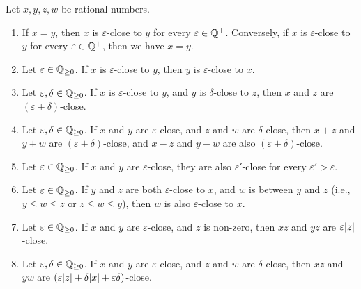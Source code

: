 \setcounter{thm}{6}
\begin{prop}\label{i:4.3.7}
  Let \(x, y, z, w\) be rational numbers.
  \begin{enumerate}
    \item\label{i:4.3.7.a} If \(x = y\), then \(x\) is \(\varepsilon\)-close to \(y\) for every \(\varepsilon \in \mathbb{Q}^+\).
    Conversely, if \(x\) is \(\varepsilon\)-close to \(y\) for every \(\varepsilon \in \mathbb{Q}^+\), then we have \(x = y\).
    \item\label{i:4.3.7.b} Let \(\varepsilon \in \mathbb{Q}_{\geq 0}\).
    If \(x\) is \(\varepsilon\)-close to \(y\), then \(y\) is \(\varepsilon\)-close to \(x\).
    \item\label{i:4.3.7.c} Let \(\varepsilon, \delta \in \mathbb{Q}_{\geq 0}\).
    If \(x\) is \(\varepsilon\)-close to \(y\), and \(y\) is \(\delta\)-close to \(z\), then \(x\) and \(z\) are \((\varepsilon + \delta)\)-close.
    \item\label{i:4.3.7.d} Let \(\varepsilon, \delta \in \mathbb{Q}_{\geq 0}\).
    If \(x\) and \(y\) are \(\varepsilon\)-close, and \(z\) and \(w\) are \(\delta\)-close, then \(x + z\) and \(y + w\) are \((\varepsilon + \delta)\)-close, and \(x - z\) and \(y - w\) are also \((\varepsilon + \delta)\)-close.
    \item\label{i:4.3.7.e} Let \(\varepsilon \in \mathbb{Q}_{\geq 0}\).
    If \(x\) and \(y\) are \(\varepsilon\)-close, they are also \(\varepsilon'\)-close for every \(\varepsilon' > \varepsilon\).
    \item\label{i:4.3.7.f} Let \(\varepsilon \in \mathbb{Q}_{\geq 0}\).
    If \(y\) and \(z\) are both \(\varepsilon\)-close to \(x\), and \(w\) is between \(y\) and \(z\) (i.e., \(y \leq w \leq z\) or \(z \leq w \leq y\)), then \(w\) is also \(\varepsilon\)-close to \(x\).
    \item\label{i:4.3.7.g} Let \(\varepsilon \in \mathbb{Q}_{\geq 0}\).
    If \(x\) and \(y\) are \(\varepsilon\)-close, and \(z\) is non-zero, then \(xz\) and \(yz\) are \(\varepsilon\abs{z}\)-close.
    \item\label{i:4.3.7.h} Let \(\varepsilon, \delta \in \mathbb{Q}_{\geq 0}\).
    If \(x\) and \(y\) are \(\varepsilon\)-close, and \(z\) and \(w\) are \(\delta\)-close, then \(xz\) and \(yw\) are \((\varepsilon\abs{z} + \delta\abs{x} + \varepsilon\delta)\)-close.
  \end{enumerate}
\end{prop}

